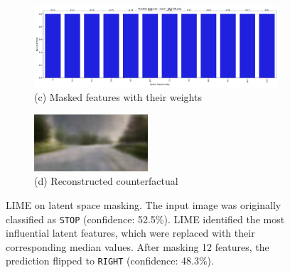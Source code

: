 \begin{figure}[h]
    \begin{subfigure}{0.72\textwidth}
        \includegraphics[width=\linewidth]{img/masking/lime_on_latent/town7_002748.png_masked_features.png}
        \caption*{(c) Masked features with their weights}
    \end{subfigure}
    \hfill
    \begin{subfigure}{0.24\textwidth}
        \includegraphics[width=\linewidth]{img/masking/lime_on_latent/reconstructed_lime_on_features.png}
        \caption*{(d) Reconstructed counterfactual}
    \end{subfigure}

    \caption[Example of LIME-based latent feature masking]{%
LIME on latent space masking. The input image was originally classified as \texttt{STOP} (confidence: 52.5\%). LIME identified the most influential latent features, which were replaced with their corresponding median values. After masking 12 features, the prediction flipped to \texttt{RIGHT} (confidence: 48.3\%).}
    \label{fig:lime_latent_example}
\end{figure}


